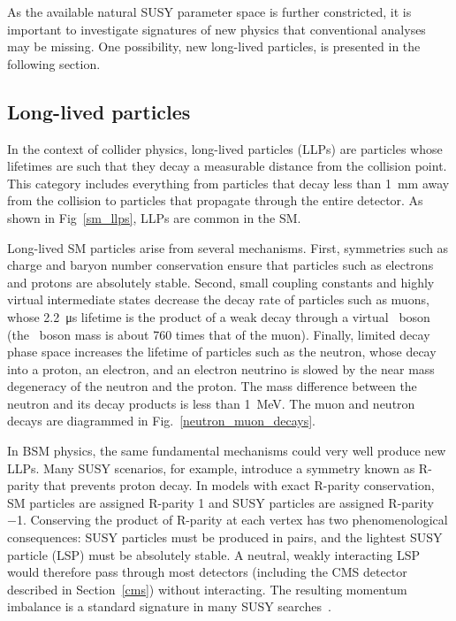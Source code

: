 

As the available natural SUSY parameter space is further constricted, it is important to investigate signatures of new physics that conventional analyses may be missing. One possibility, new long-lived particles, is presented in the following section.


\subsection{Long-lived particles}
\label{llps}
In the context of collider physics, long-lived particles (LLPs) are particles whose lifetimes are such that they decay a measurable distance from the collision point. This category includes everything from particles that decay less than \SI{1}{\mm} away from the collision to particles that propagate through the entire detector. As shown in Fig~\ref{sm_llps}, LLPs are common in the SM.



Long-lived SM particles arise from several mechanisms. First, symmetries such as charge and baryon number conservation ensure that particles such as electrons and protons are absolutely stable. Second, small coupling constants and highly virtual intermediate states decrease the decay rate of particles such as muons, whose \SI{2.2}{\us} lifetime is the product of a weak decay through a virtual \PW\ boson (the \PW\ boson mass is about \num{760} times that of the muon). Finally, limited decay phase space increases the lifetime of particles such as the neutron, whose decay into a proton, an electron, and an electron neutrino is slowed by the near mass degeneracy of the neutron and the proton. The mass difference between the neutron and its decay products is less than \SI{1}{\MeV}. The muon and neutron decays are diagrammed in Fig.~\ref{neutron_muon_decays}.



In BSM physics, the same fundamental mechanisms could very well produce new LLPs. Many SUSY scenarios, for example, introduce a symmetry known as R-parity that prevents proton decay. In models with exact R-parity conservation, SM particles are assigned R-parity \num{+1} and SUSY particles are assigned R-parity \num{-1}. Conserving the product of R-parity at each vertex has two phenomenological consequences: SUSY particles must be produced in pairs, and the lightest SUSY particle (LSP) must be absolutely stable. A neutral, weakly interacting LSP would therefore pass through most detectors (including the CMS detector described in Section~\ref{cms}) without interacting. The resulting momentum imbalance is a standard signature in many SUSY searches~\cite{pdg_2020}.


